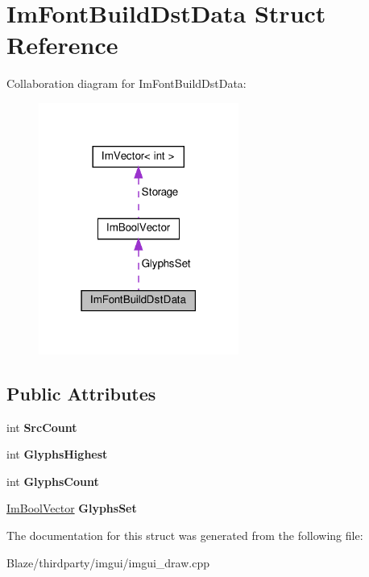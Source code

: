\hypertarget{structImFontBuildDstData}{}\section{Im\+Font\+Build\+Dst\+Data Struct Reference}
\label{structImFontBuildDstData}


Collaboration diagram for Im\+Font\+Build\+Dst\+Data\+:\nopagebreak
\begin{figure}[H]
\begin{center}
\leavevmode
\includegraphics[width=186pt]{structImFontBuildDstData__coll__graph}
\end{center}
\end{figure}
\subsection*{Public Attributes}
\begin{DoxyCompactItemize}
\item 
\mbox{\label{structImFontBuildDstData_ab13d637daba34891db2968684647a728}} 
int {\bfseries Src\+Count}
\item 
\mbox{\label{structImFontBuildDstData_a2c0592f57b8381a9d106b6881491b29c}} 
int {\bfseries Glyphs\+Highest}
\item 
\mbox{\label{structImFontBuildDstData_aeb9950177ed2ec156332ec8c3683c2e2}} 
int {\bfseries Glyphs\+Count}
\item 
\mbox{\label{structImFontBuildDstData_a20235f24452258e2ea04909d3dd075da}} 
\hyperlink{structImBoolVector}{Im\+Bool\+Vector} {\bfseries Glyphs\+Set}
\end{DoxyCompactItemize}


The documentation for this struct was generated from the following file\+:\begin{DoxyCompactItemize}
\item 
Blaze/thirdparty/imgui/imgui\+\_\+draw.\+cpp\end{DoxyCompactItemize}
